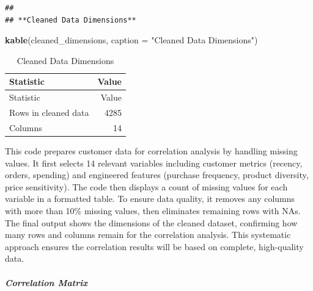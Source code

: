 \documentclass[
]{article}
\newenvironment{Shaded}{\begin{snugshade}}{\end{snugshade}}
\newcommand{\AttributeTok}[1]{\textcolor[rgb]{0.13,0.29,0.53}{#1}}
\newcommand{\FunctionTok}[1]{\textcolor[rgb]{0.13,0.29,0.53}{\textbf{#1}}}
\newcommand{\NormalTok}[1]{#1}
\newcommand{\StringTok}[1]{\textcolor[rgb]{0.31,0.60,0.02}{#1}}
\begin{document}
\begin{verbatim}
## 
## **Cleaned Data Dimensions**
\end{verbatim}

\begin{Shaded}
\begin{Highlighting}[]
\FunctionTok{kable}\NormalTok{(cleaned\_dimensions, }\AttributeTok{caption =} \StringTok{"Cleaned Data Dimensions"}\NormalTok{)}
\end{Highlighting}
\end{Shaded}

\begin{longtable}[]{@{}lr@{}}
\caption{Cleaned Data Dimensions}\tabularnewline
\toprule\noalign{}
Statistic & Value \\
\midrule\noalign{}
\endfirsthead
\toprule\noalign{}
Statistic & Value \\
\midrule\noalign{}
\endhead
\bottomrule\noalign{}
\endlastfoot
Rows in cleaned data & 4285 \\
Columns & 14 \\
\end{longtable}

This code prepares customer data for correlation analysis by handling
missing values. It first selects 14 relevant variables including
customer metrics (recency, orders, spending) and engineered features
(purchase frequency, product diversity, price sensitivity). The code
then displays a count of missing values for each variable in a formatted
table. To ensure data quality, it removes any columns with more than
10\% missing values, then eliminates remaining rows with NAs. The final
output shows the dimensions of the cleaned dataset, confirming how many
rows and columns remain for the correlation analysis. This systematic
approach ensures the correlation results will be based on complete,
high-quality data.\newpage

\subparagraph{Correlation Matrix}\label{correlation-matrix}
\end{document}
